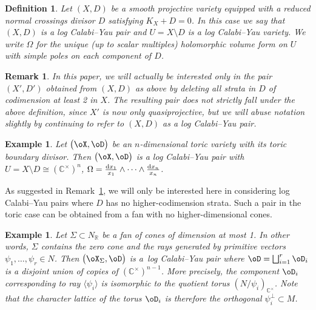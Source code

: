 \documentclass[10pt,a4paper]{amsart}
\numberwithin{equation}{section}
\newtheorem{Definition}[Theorem]{Definition}
\newtheorem{Example}[Theorem]{Example}
\newtheorem{Remark}[Theorem]{Remark} }
\def\CC{\mathbb{C}}
\def\RR{\mathbb{R}}
\begin{document}
\begin{Definition}
Let $(X,D)$ be a smooth projective variety equipped with a reduced normal crossings divisor $D$ satisfying $K_X+D=0$. In this case we say that $(X,D)$ is a {\em log Calabi--Yau pair} and $U=X\setminus D$ is a {\em log Calabi--Yau variety}. We write $\Omega$ for the unique (up to scalar multiples) holomorphic volume form on $U$ with simple poles on each component of $D$.
\end{Definition}

\begin{Remark}\label{rem:quasiproj-pair}
 In this paper, we will actually be interested only in the pair $(X',D')$ obtained from $(X,D)$ as above by deleting all strata in $D$ of codimension at least 2 in $X$. The resulting pair does not strictly fall under the above definition, since $X'$ is now only quasiprojective, but we will abuse notation slightly by continuing to refer to $(X,D)$ as a log Calabi--Yau pair.
\end{Remark}

\begin{Example}
 Let $\big(\oX,\oD\big)$ be an $n$-dimensional toric variety with its toric boundary divisor. Then $\big(\oX,\oD\big)$ is a log Calabi--Yau pair with $U=X\setminus D\cong (\CC^\times)^n$, $\Omega=\frac{{\rm d}x_1}{x_1}\wedge\cdots\wedge \frac{{\rm d}x_n}{x_n}$.
\end{Example}

As suggested in Remark~\ref{rem:quasiproj-pair}, we will only be interested here in considering log Calabi--Yau pairs where $D$ has no higher-codimension strata. Such a pair in the toric case can be obtained from a fan with no higher-dimensional cones.

\begin{Example}\label{ex:quasiproj-pair}
 Let $\Sigma\subset N_\RR$ be a fan of cones of dimension at most 1. In other words, $\Sigma$ contains the zero cone and the rays generated by primitive vectors $\psi_1,\dots,\psi_r\in N$. Then $\big(\oX_\Sigma,\oD\big)$ is a~log Calabi--Yau pair where $\oD = \bigsqcup_{i=1}^r \oD_i$ is a disjoint union of copies of $(\CC^\times)^{n-1}$. More precisely, the component $\oD_i$ corresponding to ray $\langle \psi_i\rangle$ is isomorphic to the quotient torus $(N/\psi_i)_{\CC^\times}$. Note that the character lattice of the torus $\oD_i$ is therefore the orthogonal $\psi_i^\perp\subset M$.
\end{Example}
\end{document}
